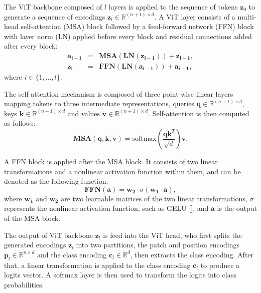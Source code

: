 \documentclass[anon,12pt]{colt2024} %
\begin{document}
The ViT backbone composed of $l$ layers is applied to the sequence of tokens $\mathbf{z}_0$ to generate a sequence of encodings $\mathbf{z}_l \in \mathbb{R} ^ {(n+1) \times d}$.
A ViT layer consists of a multi-head self-attention (MSA) block followed by a feed-forward network (FFN) block with layer norm (LN) applied before every block and residual connections added after every block:
\begin{eqnarray}
  \mathbf{a_{i-1}} &=& \mathbf{MSA}(\mathbf{LN}(\mathbf{z_{i-1}})) + \mathbf{z_{i-1}} , \\
  \mathbf{z_{i}} &=& \mathbf{FFN}(\mathbf{LN}(\mathbf{a_{i-1}})) + \mathbf{a_{i-1}},
\end{eqnarray}
where $i \in \{1,\ldots,l\}$.

The self-attention mechanism is composed of three point-wise linear layers mapping tokens to three intermediate representations, queries $\mathbf{q} \in \mathbb{R}^{(n+1) \times d}$, keys $\mathbf{k} \in \mathbb{R}^{(n+1) \times d}$ and values $\mathbf{v} \in \mathbb{R}^{(n+1) \times d}$.
Self-attention is then computed as follows:
\begin{equation}
   \mathbf{MSA}(\mathbf{q}, \mathbf{k}, \mathbf{v}) = \mathrm{softmax} \left( \frac{\mathbf{q}\mathbf{k}^T}{\sqrt{d}} \right)  \mathbf{v}.
\end{equation}

A FFN block is applied after the MSA block. It consists of two linear transformations and a nonlinear activation function within them, and can be denoted as the following function:
\begin{equation}
  \mathbf{FFN}(\mathbf{a}) = \mathbf{w_2} \cdot \sigma(\mathbf{w_1} \cdot \mathbf{a}),
\end{equation}
where $\mathbf{w_1}$ and $\mathbf{w_2}$ are two learnable matrices of the two linear transformations, $\sigma$ represents the nonlinear activation function, such as GELU [], and  $\mathbf{a}$ is the output of the MSA block.

The output of ViT backbone $\mathbf{z}_l$ is feed into the ViT head, who first splits the generated encodings $\mathbf{z}_l$ into two partitions, the patch and position encodings $\mathbf{p}_l \in \mathbb{R} ^ {n \times d}$ and the class encoding $\mathbf{c}_l \in \mathbb{R}^d$, then extracts the class encoding.
After that, a linear transformation is applied to the class encoding $\mathbf{c}_l$ to produce a logits vector. A softmax layer is then used to transform the logits into class probabilities.
\end{document}
